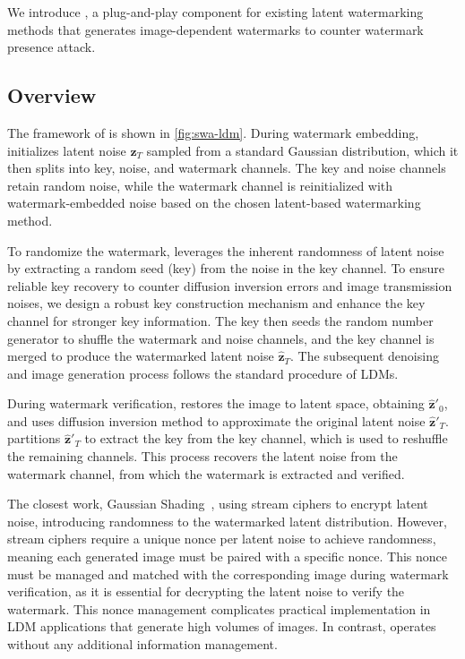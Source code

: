 We introduce \tool, a plug-and-play component for existing latent watermarking methods that generates image-dependent watermarks to counter watermark presence attack.

\subsection{Overview}
The framework of \tool is shown in \cref{fig:swa-ldm}. 
During watermark embedding, \tool initializes latent noise \(\mathbf{z}_T\) sampled from a standard Gaussian distribution, which it then splits into key, noise, and watermark channels. The key and noise channels retain random noise, while the watermark channel is reinitialized with watermark-embedded noise based on the chosen latent-based watermarking method.

To randomize the watermark,
\tool leverages the inherent randomness of latent noise by extracting a random seed (key) from the noise in the key channel. 
To ensure reliable key recovery to counter diffusion inversion errors and image transmission noises, we design a robust key construction mechanism and enhance the key channel for stronger key information. 
The key then seeds the random number generator to shuffle the watermark and noise channels, and the key channel is merged to produce the watermarked latent noise \(\hat{\mathbf{z}}_T\). The subsequent denoising and image generation process follows the standard procedure of LDMs.

During watermark verification, \tool restores the image to latent space, obtaining \(\hat{\mathbf{z}}'_0\), and uses diffusion inversion method to approximate the original latent noise \(\hat{\mathbf{z}}'_T\). \tool partitions \(\hat{\mathbf{z}}'_T\) to extract the key from the key channel, which is used to reshuffle the remaining channels. This process recovers the latent noise from the watermark channel, from which the watermark is extracted and verified.

The closest work, Gaussian Shading~\cite{yang2024gaussian}, using stream ciphers to encrypt latent noise, introducing randomness to the watermarked latent distribution. 
However, stream ciphers require a unique nonce per latent noise to achieve randomness, meaning each generated image must be paired with a specific nonce. This nonce must be managed and matched with the corresponding image during watermark verification, as it is essential for decrypting the latent noise to verify the watermark. 
This nonce management complicates practical implementation in LDM applications that generate high volumes of images. 
In contrast, \tool operates without any additional information management.

